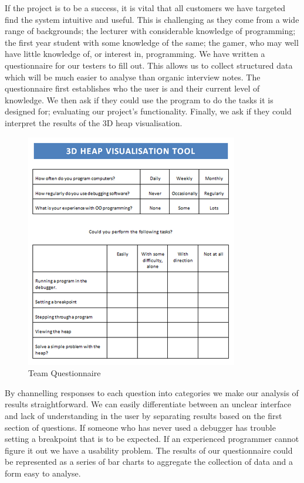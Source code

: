 \documentclass[10pt, a4paper]{article}
\begin{document}
If the project is to be a success, it is vital that all customers we have targeted find the system intuitive and useful. This is challenging as they come from a wide range of backgrounds; the lecturer with considerable knowledge of programming; the first year student with some knowledge of the same; the gamer, who may well have little knowledge of, or interest in, programming. We have written a questionnaire for our testers to fill out. This allows us to collect structured data which will be much easier to analyse than organic interview notes. The questionnaire first establishes who the user is and their current level of knowledge. We then ask if they could use the program to do the tasks it is designed for; evaluating our project’s functionality. Finally, we ask if they could interpret the results of the 3D heap visualisation.

\begin{figure}
        \centering
        \includegraphics[scale=0.5]{images/evaluation/q.png}
        \caption{Team Questionnaire}
\end{figure}

By channelling responses to each question into categories we make our analysis of results straightforward. We can easily differentiate between an unclear interface and lack of understanding in the user by separating results based on the first section of questions. If someone who has never used a debugger has trouble setting a breakpoint that is to be expected. If an experienced programmer cannot figure it out we have a usability problem. The results of our questionnaire could be represented as a series of bar charts to aggregate the collection of data and a form easy to analyse. 
\end{document}
